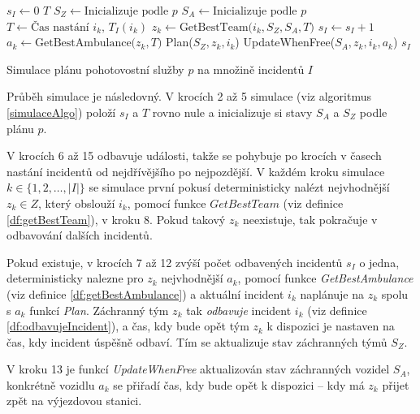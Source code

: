 \begin{algorithm}[H]
  \begin{algorithmic}[1]
    \State $s_I \gets 0$
    \State $T$ 
    \State $S_Z \gets \mbox{Inicializuje podle $p$}$
    \State $S_A \gets \mbox{Inicializuje podle $p$}$
      \State $T \gets \mbox{Čas nastání $i_k$, $T_I(i_k)$}$
      \State $z_k \gets \mbox{GetBestTeam($i_k, S_Z, S_A, T$)}$
        \State $s_I \gets s_I + 1$
        \State $a_k \gets \mbox{GetBestAmbulance($z_k, T$)}$
        \State Plan($S_Z, z_k, i_k$)
        \State UpdateWhenFree($S_A, z_k, i_k, a_k$)
      \EndIf
    \EndFor
    \State \Return $s_I$
  \EndFunction
  \end{algorithmic}
  \caption{Simulace plánu pohotovostní služby $p$ na množině incidentů $I$}
  \label{simulaceAlgo}
\end{algorithm}

\vspace*{10px}

Průběh simulace je následovný. 
V krocích 2 až 5 simulace (viz algoritmus \ref{simulaceAlgo}) položí $s_I$ a $T$ rovno nule
a inicializuje si stavy $S_A$ a $S_Z$ podle plánu $p$.

V krocích 6 až 15 odbavuje události, takže se pohybuje po krocích v časech nastání incidentů od nejdřívějšího po nejpozdější.
V každém kroku simulace $k \in \{ 1, 2, \dots , |I|\}$ se simulace první pokusí deterministicky nalézt nejvhodnější $z_k \in Z$, který obslouží $i_k$,
pomocí funkce $\textit{GetBestTeam}$ (viz definice \ref{df:getBestTeam}), v kroku 8.
Pokud takový $z_k$ neexistuje, tak pokračuje v odbavování dalších incidentů.

Pokud existuje, v krocích 7 až 12 zvýší počet odbavených incidentů $s_I$ o jedna,
deterministicky nalezne pro $z_k$ nejvhodnější $a_k$, pomocí funkce \textit{GetBestAmbulance} (viz definice \ref{df:getBestAmbulance}) a
aktuální incident $i_k$ naplánuje na $z_k$ spolu s $a_k$ funkcí \textit{Plan}.
Záchranný tým $z_k$ tak \textit{odbavuje} incident $i_k$ (viz definice \ref{df:odbavujeIncident}), a čas, kdy bude opět tým $z_k$ k dispozici je nastaven na čas, kdy incident úspěšně odbaví. 
Tím se aktualizuje stav záchranných týmů $S_Z$.

V kroku 13 je funkcí \textit{UpdateWhenFree} aktualizován stav záchranných vozidel $S_A$,
konkrétně vozidlu $a_k$ se přiřadí čas, kdy bude opět k dispozici -- kdy má $z_k$ přijet zpět na výjezdovou stanici.

